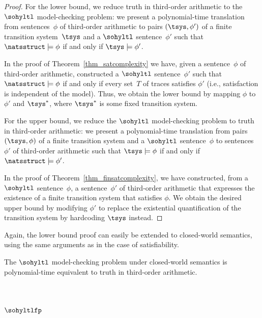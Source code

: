 \begin{proof}
For the lower bound, we reduce truth in third-order arithmetic to the $\sohyltl$ model-checking problem: we present a polynomial-time translation from sentences~$\phi$ of third-order arithmetic to pairs $(\tsys, \phi')$ of a finite transition system~$\tsys$ and a $\sohyltl$ sentence~$\phi'$ such that $\natsstruct \models \phi$ if and only if $\tsys \models \phi'$.

In the proof of Theorem~\ref{thm_satcomplexity} we have, given a sentence~$\phi$ of third-order arithmetic, constructed a $\sohyltl$ sentence~$\phi'$ such that $\natsstruct\models \phi$ if and only if every set~$T$ of traces satisfies $\phi'$ (i.e., satisfaction is independent of the model). 
Thus, we obtain the lower bound by mapping $\phi$ to $\phi'$ and $\tsys^*$, where $\tsys^*$ is some fixed transition system.

For the upper bound, we reduce the $\sohyltl$ model-checking problem to truth in third-order arithmetic: we present a polynomial-time translation from pairs~$(\tsys, \phi)$ of a finite transition system and a $\sohyltl$ sentence~$\phi$ to sentences~$\phi'$ of third-order arithmetic such that $\tsys \models \phi$ if and only if $\natsstruct \models \phi'$.

In the proof of Theorem~\ref{thm_finsatcomplexity}, we have constructed, from a $\sohyltl$ sentence~$\phi$, a sentence~$\phi'$ of third-order arithmetic that expresses the existence of a finite transition system that satisfies $\phi$. 
We obtain the desired upper bound by modifying $\phi'$ to replace the existential quantification of the transition system by hardcoding $\tsys$ instead.
\end{proof}


Again, the lower bound proof can easily be extended to closed-world semantics, using the same arguments as in the case of satisfiability.

\begin{cor}
\label{cor_mccomplexity}
The $\sohyltl$ model-checking problem under closed-world semantics is polynomial-time equivalent to truth in third-order arithmetic.
\end{cor}


\section{\texorpdfstring{$\sohyltlfp$}{Second-order HyperLTL with Minimality/Maximality Constraints}} 
\label{sec_mm}

